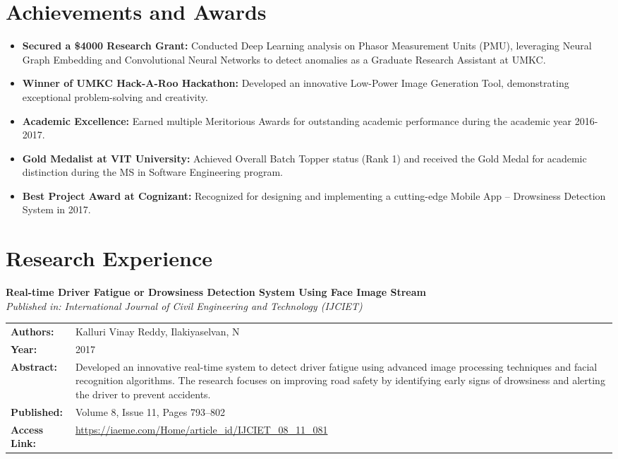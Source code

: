 \documentclass[a4paper,10pt]{article}
\begin{document}
\section*{Achievements and Awards}
\begin{itemize}[leftmargin=0.5cm, labelsep=0.3cm, itemsep=0.1em, parsep=0pt, topsep=0pt]
    \item \textbf{Secured a \$4000 Research Grant:} Conducted Deep Learning analysis on Phasor Measurement Units (PMU), leveraging Neural Graph Embedding and Convolutional Neural Networks to detect anomalies as a Graduate Research Assistant at UMKC.
    \item \textbf{Winner of UMKC Hack-A-Roo Hackathon:} Developed an innovative Low-Power Image Generation Tool, demonstrating exceptional problem-solving and creativity.
    \item \textbf{Academic Excellence:} Earned multiple Meritorious Awards for outstanding academic performance during the academic year 2016-2017.
    \item \textbf{Gold Medalist at VIT University:} Achieved Overall Batch Topper status (Rank 1) and received the Gold Medal for academic distinction during the MS in Software Engineering program.
    \item \textbf{Best Project Award at Cognizant:} Recognized for designing and implementing a cutting-edge Mobile App – Drowsiness Detection System in 2017.
\end{itemize}


\section*{Research Experience}

\noindent\textbf{Real-time Driver Fatigue or Drowsiness Detection System Using Face Image Stream} \\
\textit{Published in: International Journal of Civil Engineering and Technology (IJCIET)} \\
\vspace{0.2em}
\begin{tabularx}{\textwidth}{@{}lX@{}}
\textbf{Authors:} & Kalluri Vinay Reddy, Ilakiyaselvan, N\\
\textbf{Year:} & 2017 \\
\textbf{Abstract:} & Developed an innovative real-time system to detect driver fatigue using advanced image processing techniques and facial recognition algorithms. The research focuses on improving road safety by identifying early signs of drowsiness and alerting the driver to prevent accidents. \\
\textbf{Published:} & Volume 8, Issue 11, Pages 793–802 \\
\textbf{Access Link:} & \href{https://iaeme.com/Home/article_id/IJCIET_08_11_081}{https://iaeme.com/Home/article\_id/IJCIET\_08\_11\_081}
\end{tabularx}

\end{document}
